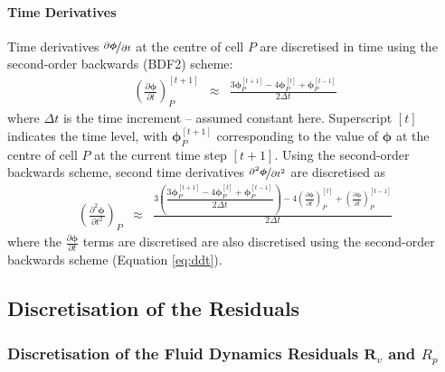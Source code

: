 \documentclass[sn-mathphys,Numbered]{sn-jnl}%
\newcommand{\bb}{\boldsymbol}
\begin{document}
\paragraph{Time Derivatives}
Time derivatives $\nicefrac{\partial \bb{\phi}}{\partial t}$ at the centre of cell $P$ are discretised in time using the second-order backwards (BDF2) scheme:
\begin{eqnarray} \label{eq:ddt}
	\left(\frac{\partial \bb{\phi}}{\partial t}\right)_P^{[t+1]}
		&\approx& \frac{3 \bb{\phi}_P^{[t+1]} - 4 \bb{\phi}_P^{[t]} + \bb{\phi}_P^{[t-1]}}{2\Delta t} 
\end{eqnarray}
where $\Delta t$ is the time increment -- assumed constant here.
Superscript $[t]$ indicates the time level, with $\bb{\phi}_P^{[t+1]}$ corresponding to the value of $\bb{\phi}$ at the centre of cell $P$ at the current time step $[t+1]$.
Using the second-order backwards scheme, second time derivatives $\nicefrac{\partial^2 \bb{\phi}}{\partial t^2}$ are discretised as
\begin{eqnarray}
	\left(\frac{\partial^2 \bb{\phi}}{\partial t^2}\right)_P
	&\approx&
	\frac{3\left( 
		\dfrac{3\bb{\phi}_P^{[t+1]} - 4\bb{\phi}_P^{[t]} + \bb{\phi}_P^{[t-1]}}{2\Delta t} 
		\right) 
	- 4\left(\frac{\partial \bb{\phi}}{\partial t}\right)_P^{[t]} + \left(\frac{\partial \bb{\phi}}{\partial t}\right)_P^{[t-1]}}{2\Delta t}
\end{eqnarray}
where the $\frac{\partial \bb{\phi}}{\partial t}$ terms are discretised are also discretised using the second-order backwards scheme (Equation \ref{eq:ddt}).



\subsection{Discretisation of the Residuals}


\subsubsection[Discretisation of the Fluid Dynamics Residuals]{Discretisation of the Fluid Dynamics Residuals $\bb{R}_v$ and $R_p$}
\end{document}
